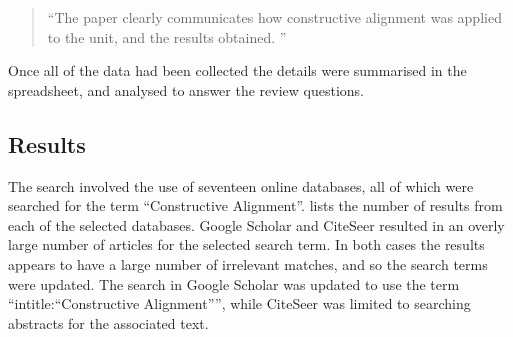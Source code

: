 \begin{quote}
``The paper clearly communicates how constructive alignment was applied to the unit, and the results obtained. ''	
\end{quote}

Once all of the data had been collected the details were summarised in the spreadsheet, and analysed to answer the review questions.



\clearpage
\subsection{Results} %
\label{sub:review_results}

The search involved the use of seventeen online databases, all of which were searched for the term ``Constructive Alignment''.  lists the number of results from each of the selected databases. Google Scholar and CiteSeer resulted in an overly large number of articles for the selected search term. In both cases the results appears to have a large number of irrelevant matches, and so the search terms were updated. The search in Google Scholar was updated to use the term ``intitle:``Constructive Alignment'''', while CiteSeer was limited to searching abstracts for the associated text.

